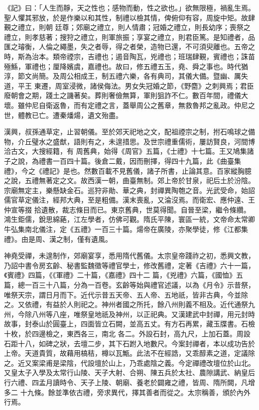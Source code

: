 
\begin{pinyinscope}

 《記》曰：「人生而靜，天之性也；感物而動，性之欲也。」欲無限極，禍亂生焉。聖人懼其邪放，於是作樂以和其性，制禮以檢其情，俾俯仰有容，周旋中矩。故肆覲之禮立，則朝
 廷尊；郊廟之禮立，則人情肅；冠婚之禮立，則長幼序；喪祭之禮立，則孝慈著；搜狩之禮立，則軍旅振；享宴之禮立，則君臣篤。是知禮者，品匯之璿衡，人倫之繩墨，失之者辱，得之者榮，造物已還，不可須臾離也。五帝之時，斯為治本。類帝禋宗，吉禮也；遏音陶瓦，兇禮也；班瑞肆覲，賓禮也；誅苗殛鯀，軍禮也；厘降嬪虞，嘉禮也。故曰，修五禮五玉，堯、舜之事也。時代猶淳，節文尚簡。及周公相成王，制五禮六樂，各有典司，其儀大備。暨幽、厲失道，平王
 東遷，周室浸微，諸侯侮法。男女失冠婚之節，《野麕》之刺興焉；君臣廢朝會之期，踐土之譏著矣。葬則奢儉無算，軍則狙詐不仁。數百年間，禮儀大壞。雖仲尼自衛返魯，而有定禮之言，蓋舉周公之舊章，無救魯邦之亂政。仲尼之世，體教已亡。遭秦燔煬，遺文殆盡。



 漢興，叔孫通草定，止習朝儀。至於郊天祀地之文，配祖禋宗之制，拊石鳴球之備物，介丘璧水之盛猷，語則有之，未遑措思。及世宗禮重儒術，屢訪賢良，河間博洽古文，大搜經籍，有
 周舊典，始得《周官》五篇，《士禮》十七篇。王又鳩集諸子之說，為禮書一百四十篇。後倉二戴，因而刪擇，得四十九篇，此《曲臺集禮》，今之《禮記》是也。然數百載不見舊儀，諸子所書，止論其意。百家縱胸臆之說，五禮無著定之文。故西漢一朝，曲臺無制。郊上帝於甘泉，祀后土於汾陰。宗廟無定主，樂懸缺金石。巡狩非勛、華之典，封禪異陶匏之音。光武受命，始詔儒官草定儀注，經邦大典，至是粗備。漢末喪亂，又淪沒焉。而衛宏、應仲遠、王仲宣等掇
 拾遺散，裁志條目而已。東京舊典，世莫得聞。自晉至梁，繼令條纘。鴻生鉅儒，銳思綿蕝，江左學者，仿佛可觀。隋氏平陳，寰區一統，文帝命太常卿牛弘集南北儀注，定《五禮》一百三十篇。煬帝在廣陵，亦聚學徒，修《江都集禮》。由是周、漢之制，僅有遺風。



 神堯受禪，未遑制作，郊廟宴享，悉用隋代舊儀。太宗皇帝踐祚之初，悉興文教，乃詔中書令房玄齡、秘書監魏徵等禮官學士，修改舊禮，定著《吉禮》六十一篇，《賓禮》四篇，《《軍禮》二十篇，《嘉禮》四十二
 篇，《兇禮》六篇，《國恤》五篇，總一百三十八篇，分為一百卷。玄齡等始與禮官述議，以為《月令》示昔祭，唯祭天宗，謂日月而下。近代示昔五天帝、五人帝、五地祇，皆非古典，今並除之。又依禮，有益於人則祀之。神州者國之所托，餘八州則義不相及。近代通祭九州，今除八州等八座，唯祭皇地祇及神州，以正祀典。又漢建武中封禪，用元封時故事，封泰山於圓臺上，四面皆立石闕，並高五丈。有方石再累，藏玉牒書。石檢十枚，於四邊檢之，東西各三，南北
 各二。外設石封，高九尺，上加石蓋。周設石距十八，如碑之狀，去壇二步，其下石跗入地數尺。今案封禪者，本以成功告於上帝。天道貴質，故藉用槁秸，樽以瓦甒。此法不在經誥，又乖醇素之道，定議除之。近又案梁甫是梁陰，代設壇於山上，乃乖處陰之義。今定禪禮改壇位於山北。又皇太子入學及太常行山陵、天子大射、合朔、陳五兵於太社、農隙講武、納皇后行六禮、四孟月讀時令、天子上陵、朝廟、養老於闢雍之禮，皆周、隋所闕，凡增多二
 十九條。餘並準依古禮，旁求異代，擇其善者而從之。太宗稱善，頒於內外行焉。




\end{pinyinscope}

